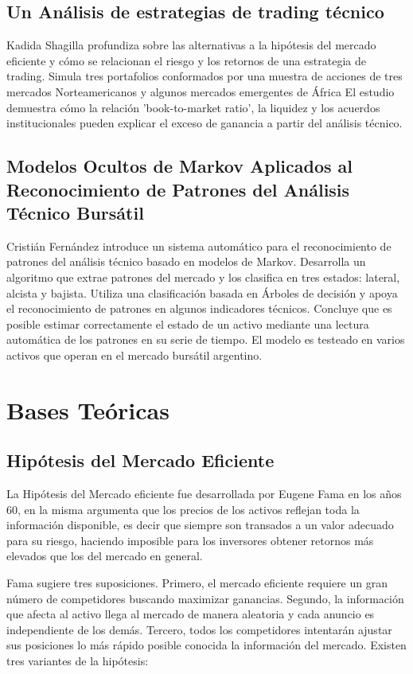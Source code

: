\documentclass[a4paper,12pt]{Latex/Classes/PhDthesisPSnPDF}
\begin{document}
\subsection{Un Análisis de estrategias de trading técnico}

Kadida Shagilla profundiza sobre las alternativas a la hipótesis del mercado eficiente y cómo se relacionan el riesgo y los retornos de una estrategia de trading. Simula tres portafolios conformados por una muestra de acciones de tres mercados Norteamericanos y algunos mercados emergentes de África El estudio demuestra cómo la relación 'book-to-market ratio', la liquidez y los acuerdos institucionales pueden explicar el exceso de ganancia a partir del análisis técnico. 

\subsection{Modelos Ocultos de Markov Aplicados al Reconocimiento de Patrones del Análisis Técnico Bursátil}

Cristián Fernández introduce un sistema automático para el reconocimiento de patrones del análisis técnico basado en modelos de Markov. Desarrolla un algoritmo que extrae patrones del mercado y los clasifica en tres estados: lateral, alcista y bajista. Utiliza una clasificación basada en Árboles de decisión y apoya el reconocimiento de patrones en algunos indicadores técnicos. Concluye que es posible estimar correctamente el estado de un activo mediante una lectura automática de los patrones en su serie de tiempo. El modelo es testeado en varios activos que operan en el mercado bursátil argentino.


\section{Bases Teóricas}


\subsection{Hipótesis del Mercado Eficiente}

La Hipótesis del Mercado eficiente fue desarrollada por Eugene Fama en los años 60, en la misma argumenta que los precios de los activos reflejan toda la información disponible, es decir que siempre son transados a un valor adecuado para su riesgo, haciendo imposible para los inversores obtener retornos más elevados que los del mercado en general. 

Fama sugiere tres suposiciones. Primero, el mercado eficiente requiere un gran número de competidores buscando maximizar ganancias. Segundo, la información que afecta al activo llega al mercado de manera aleatoria y cada anuncio es independiente de los demás. Tercero, todos los competidores intentarán ajustar sus posiciones lo más rápido posible conocida la información del mercado. Existen tres variantes de la hipótesis:
\end{document}
